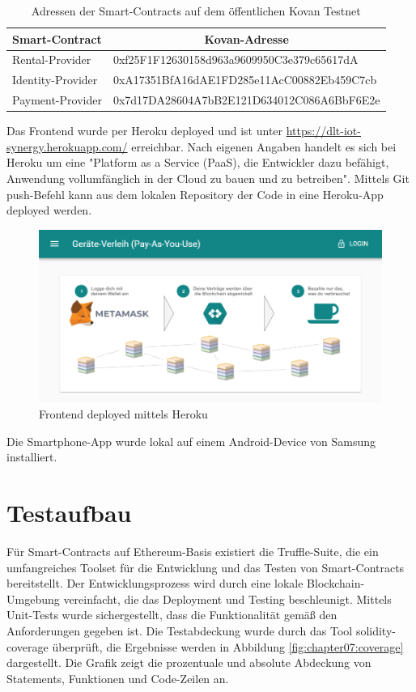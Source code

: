 \begin{table}[]
\begin{tabular}{@{}ll@{}}
\toprule
\textbf{Smart-Contract} & \multicolumn{1}{c}{\textbf{Kovan-Adresse}} \\ \midrule
Rental-Provider & 0xf25F1F12630158d963a9609950C3e379c65617dA \\
Identity-Provider & 0xA17351BfA16dAE1FD285e11AcC00882Eb459C7cb \\
Payment-Provider & 0x7d17DA28604A7bB2E121D634012C086A6BbF6E2e \\ \bottomrule
\end{tabular}
\caption{Adressen der Smart-Contracts auf dem öffentlichen Kovan Testnet}
\label{tab:addresses}
\end{table}

Das Frontend wurde per Heroku deployed und ist unter \url{https://dlt-iot-synergy.herokuapp.com/} erreichbar. Nach eigenen Angaben handelt es sich bei Heroku um eine "Platform as a Service (PaaS), die Entwickler dazu befähigt, Anwendung vollumfänglich in der Cloud zu bauen und zu betreiben". Mittels Git push-Befehl kann aus dem lokalen Repository der Code in eine Heroku-App deployed werden.

\begin{figure}[h]
 \centering
 \includegraphics[width=1.0\textwidth]{gfx/screenshots/frontend.PNG}
 \caption{Frontend deployed mittels Heroku}
 \label{fig:chapter07:frontend}
\end{figure}

Die Smartphone-App wurde lokal auf einem Android-Device von Samsung installiert.

\section{Testaufbau}
\label{sec:implementation:poc:testing}
Für Smart-Contracts auf Ethereum-Basis existiert die Truffle-Suite, die ein umfangreiches Toolset für die Entwicklung und das Testen von Smart-Contracts bereitstellt. Der Entwicklungsprozess wird durch eine lokale Blockchain-Umgebung vereinfacht, die das Deployment und Testing beschleunigt. Mittels Unit-Tests wurde sichergestellt, dass die Funktionalität gemäß den Anforderungen gegeben ist. Die Testabdeckung wurde durch das Tool solidity-coverage überprüft, die Ergebnisse werden in Abbildung \ref{fig:chapter07:coverage} dargestellt. Die Grafik zeigt die prozentuale und absolute Abdeckung von Statements, Funktionen und Code-Zeilen an.

